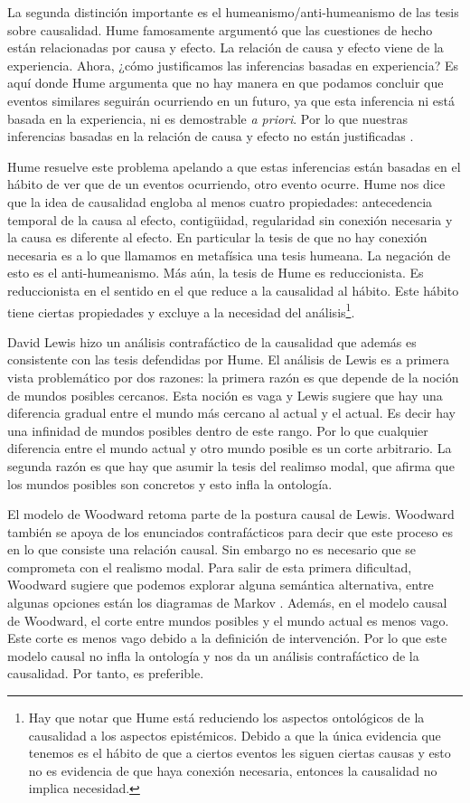 La segunda distinción importante es el humeanismo/anti-humeanismo de las tesis sobre causalidad. Hume famosamente argumentó que las cuestiones de hecho están relacionadas por causa y efecto. La relación de causa y efecto viene de la experiencia. Ahora, ¿cómo justificamos las inferencias basadas en experiencia? Es aquí donde Hume argumenta que no hay manera en que podamos concluir que eventos similares seguirán ocurriendo en un futuro, ya que esta inferencia ni está basada en la experiencia, ni es demostrable \textit{a priori}. Por lo que nuestras inferencias basadas en la relación de causa y efecto no están justificadas \cite{Hume2017}.

Hume resuelve este problema apelando a que estas inferencias están basadas en el hábito de ver que de un eventos ocurriendo, otro evento ocurre. Hume nos dice que la idea de causalidad engloba al menos cuatro propiedades: antecedencia temporal de la causa al efecto, contigüidad, regularidad sin conexión necesaria y la causa es diferente al efecto. En particular la tesis de que no hay conexión necesaria es a lo que llamamos en metafísica una tesis humeana. La negación de esto es el anti-humeanismo. Más aún, la tesis de Hume es reduccionista. Es reduccionista en el sentido en el que reduce a la causalidad al hábito. Este hábito tiene ciertas propiedades y excluye a la necesidad del análisis\footnote{Hay que notar que Hume está reduciendo los aspectos ontológicos de la causalidad a los aspectos epistémicos. Debido a que la única evidencia que tenemos es el hábito de que a ciertos eventos les siguen ciertas causas y esto no es evidencia de que haya conexión necesaria, entonces la causalidad no implica necesidad.}.

David Lewis \citeyear{Lewis1973a} hizo un análisis contrafáctico de la causalidad que además es consistente con las tesis defendidas por Hume. El análisis de Lewis es a primera vista problemático por dos razones: la primera razón es que depende de la noción de mundos posibles cercanos. Esta noción es vaga y Lewis sugiere que hay una diferencia gradual entre el mundo más cercano al actual y el actual. Es decir hay una infinidad de mundos posibles dentro de este rango. Por lo que cualquier diferencia entre el mundo actual y otro mundo posible es un corte arbitrario. La segunda razón es que hay que asumir la tesis del realimso modal, que afirma que los mundos posibles son concretos y esto infla la ontología.

El modelo de Woodward retoma parte de la postura causal de Lewis. Woodward también se apoya de los enunciados contrafácticos para decir que este proceso es en lo que consiste una relación causal. Sin embargo no es necesario que se comprometa con el realismo modal. Para salir de esta primera dificultad, Woodward sugiere que podemos explorar alguna semántica alternativa, entre algunas opciones están los diagramas de Markov \cite{pittphilsci18628}. Además, en el modelo causal de Woodward, el corte entre mundos posibles y el mundo actual es menos vago. Este corte es menos vago debido a la definición de intervención. Por lo que este modelo causal no infla la ontología y nos da un análisis contrafáctico de la causalidad. Por tanto, es preferible.

